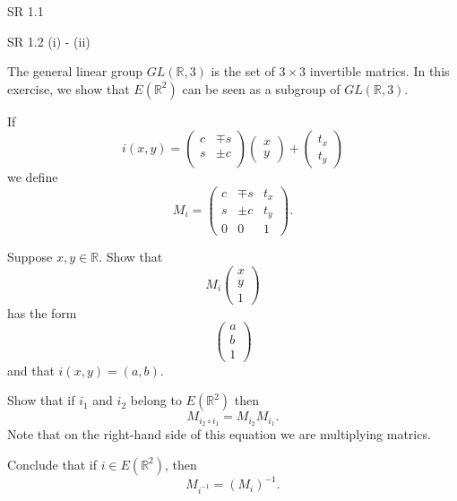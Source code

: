 \documentclass[minion]{homework}
\newcommand{\Reals}{\mathbb{R}}
\begin{document}
\begin{aproblems}

\hproblem SR 1.1

\hproblem SR 1.2 (i) - (ii)

\hproblem The general linear group $GL(\Reals,3)$ is the set of $3\times 3$ invertible matrics.
In this exercise, we show that $E(\Reals^2)$ can be seen as a subgroup of $GL(\Reals,3)$.

If
\begin{equation}
i(x,y) = \begin{pmatrix} c & \mp s  \\
s & \pm c \\
\end{pmatrix} \begin{pmatrix} x \\ y \end{pmatrix} +\begin{pmatrix} t_x \\ t_y \end{pmatrix}
\end{equation}
we define
\begin{equation}
M_i = \begin{pmatrix} c & \mp s & t_x \\
s & \pm c & t_y \\
0 &  0 & 1\end{pmatrix}.
\end{equation}
\begin{subproblems}
\item Suppose $x,y\in \Reals$. Show that 
\begin{equation}
M_i \begin{pmatrix} x \\ y \\ 1 \end{pmatrix}
\end{equation}
has the form
\begin{equation}
\begin{pmatrix} a \\ b \\ 1 \end{pmatrix}
\end{equation}
and that $i(x,y)=(a,b)$.
\item Show that if $i_1$ and $i_2$ belong to $E(\Reals^2)$ then
\begin{equation}
M_{i_2\circ i_1} = M_{i_2} M_{i_1}.
\end{equation}
Note that on the right-hand side of this equation we are multiplying matrics.
\item  Conclude that if $i\in E(\Reals^2)$, then
\begin{equation}
M_{i^{-1}} = (M_i)^{-1}.
\end{equation}
\end{subproblems}

\end{aproblems}
\end{document}
